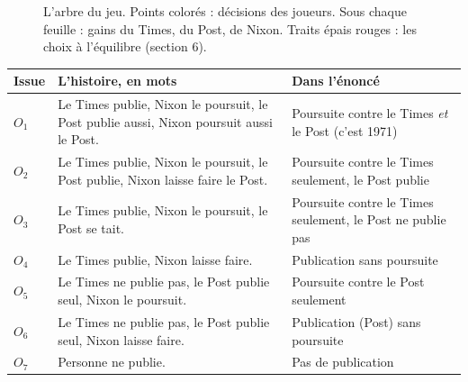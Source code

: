\documentclass[11pt,a4paper]{article}
\theoremstyle{definition}
\begin{document}
\begin{figure}[H]
\caption{L'arbre du jeu. Points colorés : décisions des joueurs. Sous chaque feuille : gains du Times, du Post, de Nixon. Traits épais rouges : les choix à l'équilibre (section 6).}
\end{figure}

\begin{center}
\small
\begin{tabularx}{\textwidth}{@{}lX>{\raggedright\arraybackslash}p{4.6cm}@{}}
\toprule
Issue & L'histoire, en mots & Dans l'énoncé \\
\midrule
$O_1$ & Le Times publie, Nixon le poursuit, le Post publie aussi, Nixon poursuit aussi le Post. & Poursuite contre le Times \emph{et} le Post (c'est 1971) \\
$O_2$ & Le Times publie, Nixon le poursuit, le Post publie, Nixon laisse faire le Post. & Poursuite contre le Times seulement, le Post publie \\
$O_3$ & Le Times publie, Nixon le poursuit, le Post se tait. & Poursuite contre le Times seulement, le Post ne publie pas \\
$O_4$ & Le Times publie, Nixon laisse faire. & Publication sans poursuite \\
$O_5$ & Le Times ne publie pas, le Post publie seul, Nixon le poursuit. & Poursuite contre le Post seulement \\
$O_6$ & Le Times ne publie pas, le Post publie seul, Nixon laisse faire. & Publication (Post) sans poursuite \\
$O_7$ & Personne ne publie. & Pas de publication \\
\bottomrule
\end{tabularx}
\end{center}
\end{document}
